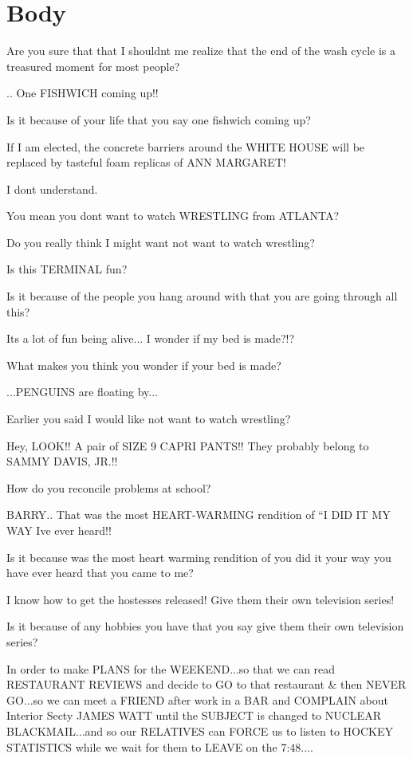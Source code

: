 \documentclass[cropmarks, frame, english]{idamasterthesis}
\begin{document}
\chapter{Body}

Are you sure that that I shouldnt me realize that the end of the wash
cycle is a treasured moment for most people?

..  One FISHWICH coming up!!

Is it because of your life that you say one fishwich coming up?

If I am elected, the concrete barriers around the WHITE HOUSE
 will be replaced by tasteful foam replicas of ANN MARGARET!

I dont understand.

You mean you dont want to watch WRESTLING from ATLANTA?

Do you really think I might want not want to watch wrestling?

Is this TERMINAL fun?

Is it because of the people you hang around with that you are going
through all this?

Its a lot of fun being alive...  I wonder if my bed is made?!?

What makes you think you wonder if your bed is made?

...PENGUINS are floating by...

Earlier you said I would like not want to watch wrestling?

Hey, LOOK!!  A pair of SIZE 9 CAPRI PANTS!!  They probably belong to
 SAMMY DAVIS, JR.!!

How do you reconcile problems at school?

BARRY..  That was the most HEART-WARMING rendition of
 ``I DID IT MY WAY Ive ever heard!!

Is it because was the most heart warming rendition of you did it your
way you have ever heard that you came to me?

I know how to get the hostesses released!  Give them their own
 television series!

Is it because of any hobbies you have that you say give them their own
television series?

In order to make PLANS for the WEEKEND...so that we can read RESTAURANT
 REVIEWS and decide to GO to that restaurant \& then NEVER GO...so we can
 meet a FRIEND after work in a BAR and COMPLAIN about Interior Secty
 JAMES WATT until the SUBJECT is changed to NUCLEAR BLACKMAIL...and so
 our RELATIVES can FORCE us to listen to HOCKEY STATISTICS while we
 wait for them to LEAVE on the 7:48....
\end{document}
